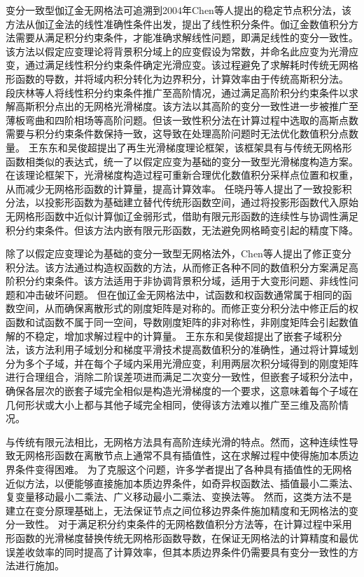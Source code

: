 变分一致型伽辽金无网格法可追溯到2004年Chen等人\cite{chen2001}提出的稳定节点积分法，该方法从伽辽金法的线性准确性条件出发，提出了线性积分条件。伽辽金数值积分方法需要从满足积分约束条件，才能准确求解线性问题，即满足线性的变分一致性。该方法以假定应变理论将背景积分域上的应变假设为常数，并命名此应变为光滑应变，通过满足线性积分约束条件确定光滑应变。该过程避免了求解耗时传统无网格形函数的导数，并将域内积分转化为边界积分，计算效率由于传统高斯积分法。
段庆林等人\cite{duan2012, duan2014}将线性积分约束条件推广至高阶情况，通过满足高阶积分约束条件以求解高斯积分点出的无网格光滑梯度。该方法以其高阶的变分一致性进一步被推广至薄板弯曲\cite{WangBingBing2019}和四阶相场\cite{shao2024}等高阶问题。但该一致性积分法在计算过程中选取的高斯点数需要与积分约束条件数保持一致，这导致在处理高阶问题时无法优化数值积分点数量。
王东东和吴俊超提出了再生光滑梯度理论框架\cite{wang2019}，该框架具有与传统无网格形函数相类似的表达式，统一了以假定应变为基础的变分一致型光滑梯度构造方案。在该理论框架下，光滑梯度构造过程可重新合理优化数值积分采样点位置和权重，从而减少无网格形函数的计算量，提高计算效率。
任晓丹等人\cite{wang2023}提出了一致投影积分法，以投影形函数为基础建立替代传统形函数空间，通过将投影形函数代入原始无网格形函数中近似计算伽辽金弱形式，借助有限元形函数的连续性与协调性满足积分约束条件。但该方法内嵌有限元形函数，无法避免网格畸变引起的精度下降。

除了以假定应变理论为基础的变分一致型无网格法外，Chen等人\cite{chen1996}提出了修正变分积分法。该方法通过构造权函数的方法，从而修正各种不同的数值积分方案满足高阶积分约束条件。该方法适用于非协调背景积分域，适用于大变形问题、非线性问题和冲击破坏问题。
但在伽辽金无网格法中，试函数和权函数通常属于相同的函数空间，从而确保离散形式的刚度矩阵是对称的。而修正变分积分法中修正后的权函数和试函数不属于同一空间，导数刚度矩阵的非对称性，非刚度矩阵会引起数值解的不稳定，增加求解过程中的计算量。
王东东和吴俊超提出了嵌套子域积分法\cite{wang2016}，该方法利用子域划分和梯度平滑技术提高数值积分的准确性，通过将计算域划分为多个子域，并在每个子域内采用光滑应变，利用两层次积分域得到的刚度矩阵进行合理组合，消除二阶误差项进而满足二次变分一致性，但嵌套子域积分法中，确保各层次的嵌套子域完全相似是构造光滑梯度的一个要求，这意味着每个子域在几何形状或大小上都与其他子域完全相同，使得该方法难以推广至三维及高阶情况。

与传统有限元法相比，无网格方法具有高阶连续光滑的特点。然而，这种连续性导致无网格形函数在离散节点上通常不具有插值性，这在求解过程中使得施加本质边界条件变得困难。
为了克服这个问题，许多学者提出了各种具有插值性的无网格近似方法，以便能够直接施加本质边界条件\cite{CaoYang2020,fernandez-mendez2004}，如奇异权函数法\cite{kaljevic1997}、插值最小二乘法\cite{liu2019,ChenXinXin2021}、复变量移动最小二乘法\cite{ChengYuMin2005}、广义移动最小二乘法\cite{HuangJuan2007}、变换法\cite{chen2000}等。
然而，这类方法不是建立在变分原理基础上，无法保证节点之间位移边界条件施加精度和无网格法的变分一致性。
对于满足积分约束条件的无网格数值积分方法\cite{chen2001,duan2012,chen2013,wang2016,wang2019,wang2023}等，在计算过程中采用形函数的光滑梯度替换传统无网格形函数导数，在保证无网格法的计算精度和最优误差收敛率的同时提高了计算效率，但其本质边界条件仍需要具有变分一致性的方法进行施加\cite{WuJunChao2016,hillman2021}。

